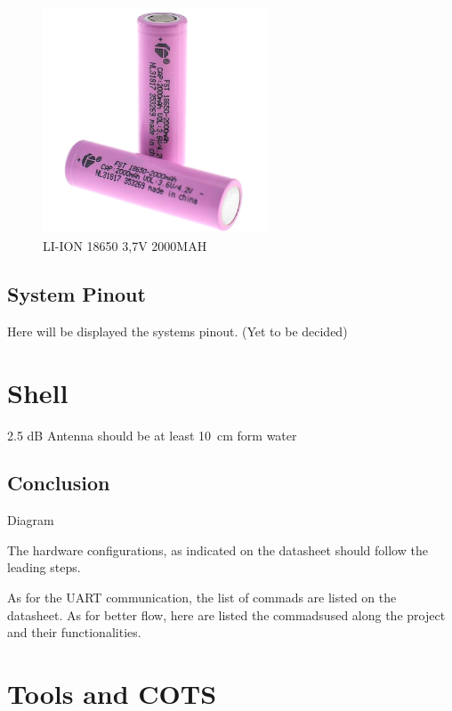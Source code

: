 
\begin{figure}[H]
    \centering
    \includegraphics[width=0.6\textwidth]{images/chapter/design/components/batt.jpg}  %
    \caption{LI-ION 18650 3,7V 2000MAH}
    \label{fig:Battery}        
\end{figure}

\subsection{System Pinout}

Here will be displayed the systems pinout. (Yet to be decided)

\section{Shell}
2.5 dB Antenna should be at least 10 cm form water 


\subsection{Conclusion}

Diagram


The hardware configurations, as indicated on the datasheet should follow the leading steps.

As for the UART communication, the list of commads are listed on the datasheet. 
As for better flow, here are listed the commadsused along the project and their functionalities. 


\section{Tools and COTS}
